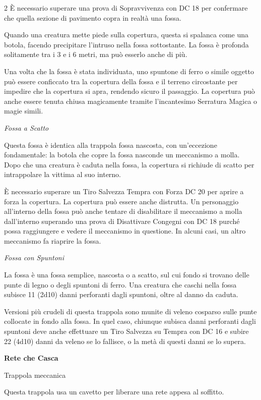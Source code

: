 \begin{multicols}{2}
È necessario superare una prova di Sopravvivenza con DC 18 per confermare che quella sezione di pavimento copra in realtà una fossa.

Quando una creatura mette piede sulla copertura, questa si spalanca come una botola, facendo precipitare l'intruso nella fossa sottostante. La fossa è profonda solitamente tra i 3 e i 6 metri, ma può esserlo anche di più.

Una volta che la fossa è stata individuata, uno spuntone di ferro o simile oggetto può essere conficcato tra la copertura della fossa e il terreno circostante per impedire che la copertura si apra, rendendo sicuro il passaggio. La copertura può anche essere tenuta chiusa magicamente tramite l'incantesimo Serratura Magica o magie simili.

\medskip
\emph{Fossa a Scatto}

Questa fossa è identica alla trappola fossa nascosta, con un'eccezione fondamentale: la botola che copre la fossa nasconde un meccanismo a molla. Dopo che una creatura è caduta nella fossa, la copertura si richiude di scatto per intrappolare la vittima al suo interno.

È necessario superare un Tiro Salvezza Tempra con Forza DC 20 per aprire a forza la copertura. La copertura può essere anche distrutta. Un personaggio all'interno della fossa può anche tentare di disabilitare il meccanismo a molla dall'interno superando una prova di Disattivare Congegni con DC 18 purché possa raggiungere e vedere il meccanismo in questione. In alcuni casi, un altro meccanismo fa riaprire la fossa.

\medskip

\emph{Fossa con Spuntoni}

La fossa è una fossa semplice, nascosta o a scatto, sul cui fondo si trovano delle punte di legno o degli spuntoni di ferro. Una creatura che caschi nella fossa subisce 11 (2d10) danni perforanti dagli spuntoni, oltre al danno da caduta.

Versioni più crudeli di questa trappola sono munite di veleno cosparso sulle punte collocate in fondo alla fossa. In quel caso, chiunque subisca danni perforanti dagli spuntoni deve anche effettuare un Tiro Salvezza su Tempra con DC 16 e subire 22 (4d10) danni da veleno se lo fallisce, o la metà di questi danni se lo supera.

\medskip

\textbf{Rete che Casca}

Trappola meccanica

Questa trappola usa un cavetto per liberare una rete appesa al soffitto.


\end{multicols}
